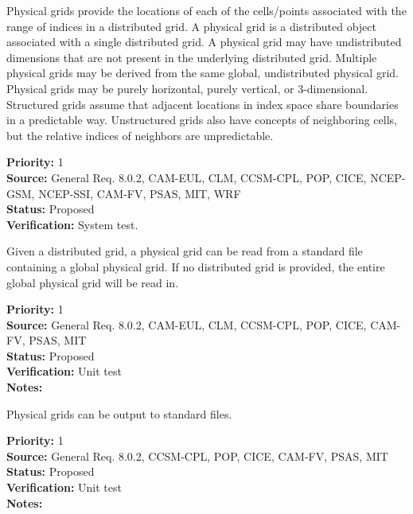 
Physical grids provide the locations of each of the cells/points
associated with the range of indices in a distributed grid.  A physical grid is a
distributed object associated with a single distributed grid.  A physical grid may have
undistributed dimensions that are not present in the underlying distributed grid. 
Multiple physical grids may be derived from the same global, undistributed physical grid. 
Physical grids may be purely horizontal, purely vertical, or 3-dimensional. 
Structured grids assume that adjacent locations in index space share boundaries
in a predictable way.  Unstructured grids also have concepts of neighboring
cells, but the relative indices of neighbors are unpredictable.

\begin{reqlist}
{\bf Priority:} 1 \\
{\bf Source:} General Req. 8.0.2, CAM-EUL, CLM, CCSM-CPL, POP, CICE, NCEP-GSM, NCEP-SSI,
     CAM-FV, PSAS, MIT, WRF \\
{\bf Status:} Proposed \\
{\bf Verification:} System test.
\end{reqlist}

Given a distributed grid, a physical grid can be read from a standard file containing a
global physical grid. If no distributed grid is provided, the entire global physical grid will
be read in.
\begin{reqlist}
{\bf Priority:} 1 \\
{\bf Source:} General Req. 8.0.2, CAM-EUL, CLM, CCSM-CPL, POP, CICE, 
              CAM-FV, PSAS, MIT \\
{\bf Status:} Proposed \\
{\bf Verification:} Unit test\\
{\bf Notes:} 
\end{reqlist}

Physical grids can be output to standard files.
\begin{reqlist}
{\bf Priority:} 1 \\
{\bf Source:} General Req. 8.0.2, CCSM-CPL, POP, CICE, 
              CAM-FV, PSAS, MIT \\
{\bf Status:} Proposed \\
{\bf Verification:} Unit test\\
{\bf Notes:} 
\end{reqlist}

